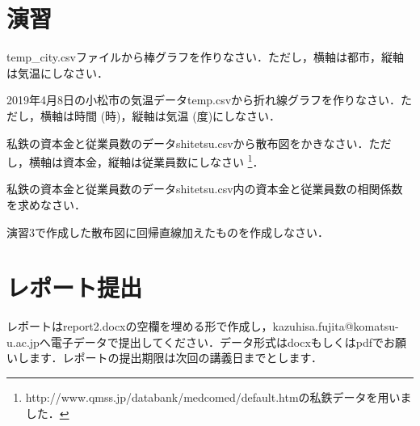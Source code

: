 \section{演習}

\practice
temp\_city.csvファイルから棒グラフを作りなさい．ただし，横軸は都市，縦軸は気温にしなさい．

\practice
2019年4月8日の小松市の気温データtemp.csvから折れ線グラフを作りなさい．ただし，横軸は時間 (時)，縦軸は気温 (度)にしなさい．

\practice
私鉄の資本金と従業員数のデータshitetsu.csvから散布図をかきなさい．ただし，横軸は資本金，縦軸は従業員数にしなさい
\footnote{http://www.qmss.jp/databank/medcomed/default.htmの私鉄データを用いました．}．

\practice
私鉄の資本金と従業員数のデータshitetsu.csv内の資本金と従業員数の相関係数を求めなさい．

\practice
演習3で作成した散布図に回帰直線加えたものを作成しなさい．

\section{レポート提出}

レポートはreport2.docxの空欄を埋める形で作成し，kazuhisa.fujita@komatsu-u.ac.jpへ電子データで提出してください．データ形式はdocxもしくはpdfでお願いします．レポートの提出期限は次回の講義日までとします．
